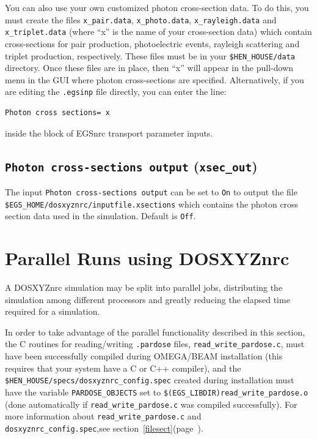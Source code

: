 \documentclass[12pt,twoside]{article}      %
\newcommand{\indexm}[1]{\index{#1}}
\begin{document}
You can also use your own customized photon cross-section data.  To do this,
you must create the files {\tt x\_pair.data}, {\tt x\_photo.data}, {\tt x\_rayleigh.data} and
{\tt x\_triplet.data} (where ``x'' is the name of your cross-section data)
which contain cross-sections for  pair production, photoelectric events, rayleigh scattering and triplet production, respectively.  These files must be in
your {\tt \$HEN\_HOUSE/data} directory.  Once these files are in place, then
``x'' will appear in the pull-down menu in the GUI where photon
cross-sections are specified.  Alternatively, if you are editing the
{\tt .egsinp} file directly, you can enter the line:
\begin{verbatim}
Photon cross sections= x
\end{verbatim}
inside the block of EGSnrc transport parameter inputs.


\subsection{{\tt Photon cross-sections output} ({\tt xsec\_out})}

The input {\tt Photon cross-sections output} can be set to {\tt On} to
output the file\\
 {\tt \$EGS\_HOME/dosxyznrc/inputfile.xsections} which
contains the photon cross section data used in the simulation.  Default
is {\tt Off}.

\indexm{Parallel runs}
\section{Parallel Runs using DOSXYZnrc}
\label{parallelcalc}

A DOSXYZnrc simulation may be split into parallel jobs, distributing the
simulation among different processors and greatly reducing the elapsed time
required for a simulation.

In order to take advantage of the parallel functionality described in this
section, the C routines for reading/writing {\tt .pardose}
files,
{\tt read\_write\_pardose.c}, must have been successfully
compiled during OMEGA/BEAM
installation (this requires that your system have a C or C++ compiler), and
the {\tt \$HEN\_HOUSE/specs/dosxyznrc\_config.spec} created during
installation must have the variable {\tt PARDOSE\_OBJECTS}
set to {\tt \$(EGS\_LIBDIR)read\_write\_pardose.o} (done automatically
if {\tt read\_write\_pardose.c} was compiled successfully).  For more
information about {\tt read\_write\_pardose.c} and {\tt
dosxyznrc\_config.spec},see section~\ref{filesect}(page~\pageref{filesect}).
\end{document}
